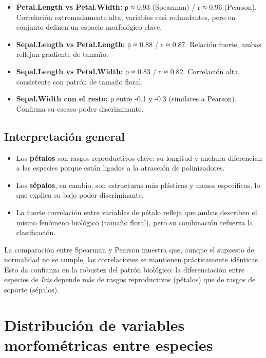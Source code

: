 \documentclass[
  spanish,
  11pt,
  a4paper,
  DIV=11,
  numbers=noendperiod]{scrartcl}
\providecommand{\tightlist}{%
  \setlength{\itemsep}{0pt}\setlength{\parskip}{0pt}}
\begin{document}
\begin{itemize}
\tightlist
\item
  \textbf{Petal.Length vs Petal.Width:} ρ ≈ 0.93 (Spearman) / r ≈ 0.96
  (Pearson). Correlación extremadamente alta; variables casi
  redundantes, pero en conjunto definen un espacio morfológico clave.\\
\item
  \textbf{Sepal.Length vs Petal.Length:} ρ ≈ 0.88 / r ≈ 0.87. Relación
  fuerte, ambas reflejan gradiente de tamaño.\\
\item
  \textbf{Sepal.Length vs Petal.Width:} ρ ≈ 0.83 / r ≈ 0.82. Correlación
  alta, consistente con patrón de tamaño floral.\\
\item
  \textbf{Sepal.Width con el resto:} ρ entre -0.1 y -0.3 (similares a
  Pearson). Confirma su escaso poder discriminante.
\end{itemize}

\subsection{Interpretación general}\label{interpretaciuxf3n-general}

\begin{itemize}
\item
  Los \textbf{pétalos} son rasgos reproductivos clave: su longitud y
  anchura diferencian a las especies porque están ligados a la atracción
  de polinizadores.
\item
  Los \textbf{sépalos}, en cambio, son estructuras más plásticas y menos
  específicas, lo que explica su bajo poder discriminante.
\item
  La fuerte correlación entre variables de pétalo refleja que ambas
  describen el mismo fenómeno biológico (tamaño floral), pero su
  combinación refuerza la clasificación.
\end{itemize}

La comparación entre Spearman y Pearson muestra que, aunque el supuesto
de normalidad no se cumple, las correlaciones se mantienen prácticamente
idénticas. Esto da confianza en la robustez del patrón biológico: la
diferenciación entre especies de \emph{Iris} depende más de rasgos
reproductivos (pétalos) que de rasgos de soporte (sépalos).

\section{Distribución de variables morfométricas entre
especies}\label{distribuciuxf3n-de-variables-morfomuxe9tricas-entre-especies}
\end{document}

